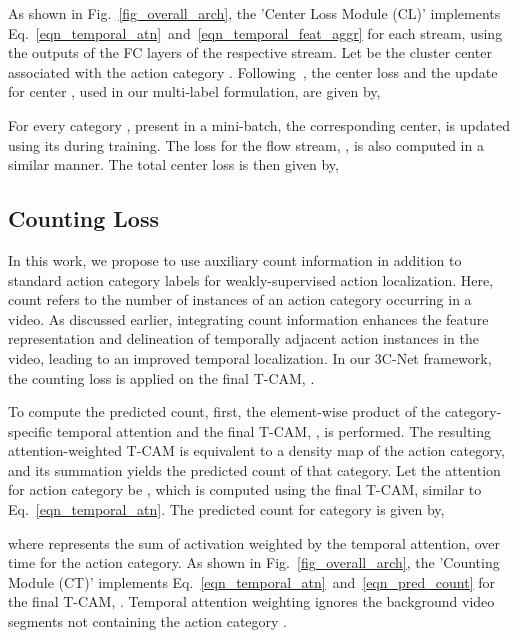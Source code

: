 \documentclass[10pt,twocolumn,letterpaper]{article}
\begin{document}
As shown in Fig.~\ref{fig_overall_arch}, the 'Center Loss Module (CL)' implements Eq.~\ref{eqn_temporal_atn}~and~\ref{eqn_temporal_feat_aggr} for each stream, using the outputs of the FC layers of the respective stream. 
Let  be the cluster center associated with the action category . Following~\cite{center_loss}, the center loss and the update for center , used in our multi-label formulation, are given by, 


For every category , present in a mini-batch, the corresponding center,  is updated using its  during training.
The loss for the flow stream, , is also computed in a similar manner. The total center loss is then given by,




\subsection{Counting Loss\label{sec_count_loss}}
In this work, we propose to use auxiliary count information in addition to standard action category labels for weakly-supervised action localization. Here, count refers to the number of instances of an action category occurring in a video. As discussed earlier, integrating count information enhances the feature representation and delineation of temporally adjacent action instances in the video, leading to an improved temporal localization. In our 3C-Net framework, the counting loss is applied on the final T-CAM, .

To compute the predicted count, first, the element-wise product of the category-specific temporal attention and the final T-CAM, , is performed. The resulting attention-weighted T-CAM is equivalent to a density map \cite{cholakkal2019object} of the action category, and its summation yields the predicted count of that category.
Let the attention for action category  be , which is computed using the final T-CAM, similar to 
Eq.~\ref{eqn_temporal_atn}. The predicted count for category  is given by,  

\noindent where  represents the sum of activation weighted by the temporal attention, over time for the  action category. As shown in Fig.~\ref{fig_overall_arch}, the 'Counting Module (CT)' implements Eq.~\ref{eqn_temporal_atn}~and~\ref{eqn_pred_count} for the final T-CAM, . Temporal attention weighting ignores the background video segments not containing the action category .
 
\end{document}
